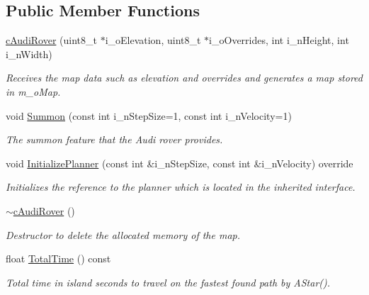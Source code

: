 \subsection*{Public Member Functions}
\begin{DoxyCompactItemize}
\item 
\mbox{\hyperlink{classplanner_1_1c_audi_rover_abafb926aca93fb8382284a10bd341986}{c\+Audi\+Rover}} (uint8\+\_\+t $\ast$i\+\_\+o\+Elevation, uint8\+\_\+t $\ast$i\+\_\+o\+Overrides, int i\+\_\+n\+Height, int i\+\_\+n\+Width)
\begin{DoxyCompactList}\small\item\em Receives the map data such as elevation and overrides and generates a map stored in m\+\_\+o\+Map. \end{DoxyCompactList}\item 
\mbox{\label{classplanner_1_1c_audi_rover_a9344499573a5599a5d42040c34b3fdf9}} 
void \mbox{\hyperlink{classplanner_1_1c_audi_rover_a9344499573a5599a5d42040c34b3fdf9}{Summon}} (const int i\+\_\+n\+Step\+Size=1, const int i\+\_\+n\+Velocity=1)
\begin{DoxyCompactList}\small\item\em The summon feature that the Audi rover provides. \end{DoxyCompactList}\item 
\mbox{\label{classplanner_1_1c_audi_rover_af32b3dd5bc9e3916242a3c0aeaae5c26}} 
void \mbox{\hyperlink{classplanner_1_1c_audi_rover_af32b3dd5bc9e3916242a3c0aeaae5c26}{Initialize\+Planner}} (const int \&i\+\_\+n\+Step\+Size, const int \&i\+\_\+n\+Velocity) override
\begin{DoxyCompactList}\small\item\em Initializes the reference to the planner which is located in the inherited interface. \end{DoxyCompactList}\item 
\mbox{\label{classplanner_1_1c_audi_rover_a9057332995c0ac8a286551345aee9cc7}} 
\mbox{\hyperlink{classplanner_1_1c_audi_rover_a9057332995c0ac8a286551345aee9cc7}{$\sim$c\+Audi\+Rover}} ()
\begin{DoxyCompactList}\small\item\em Destructor to delete the allocated memory of the map. \end{DoxyCompactList}\item 
\mbox{\label{classplanner_1_1c_audi_rover_aa2742130960fa69430731172e99db59e}} 
float \mbox{\hyperlink{classplanner_1_1c_audi_rover_aa2742130960fa69430731172e99db59e}{Total\+Time}} () const
\begin{DoxyCompactList}\small\item\em Total time in island seconds to travel on the fastest found path by A\+Star(). \end{DoxyCompactList}\end{DoxyCompactItemize}
